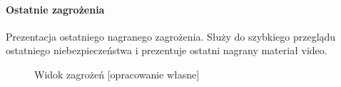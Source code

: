 \documentclass[polish,bachelor,a4paper,oneside]{ppfcmthesis}
\begin{document}
    \paragraph{Ostatnie zagrożenia}
    Prezentacja ostatniego nagranego zagrożenia. Służy do szybkiego przeglądu ostatniego niebezpieczeństwa i prezentuje ostatni nagrany materiał video.
    \nopagebreak
    \begin{figure}[H]
        \centering
        \hfill
        \hfill
        \caption{Widok zagrożeń [opracowanie własne]}
        \label{fig:zagrozenia}
    \end{figure}
    \pagebreak
\end{document}
